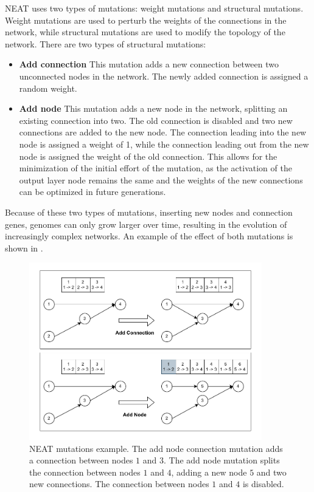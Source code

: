 NEAT uses two types of mutations: weight mutations and structural mutations. Weight mutations are used to perturb the weights of the connections in the network, while
structural mutations are used to modify the topology of the network. There are two types of structural mutations:

\begin{itemize}
    \item \textbf{Add connection} This mutation adds a new connection between two unconnected nodes in the network. The newly added connection is assigned a random weight.
    \item \textbf{Add node} This mutation adds a new node in the network, splitting an existing connection into two. The old connection is disabled and two new
        connections are added to the new node. The connection leading into the new node is assigned a weight of 1, while the connection leading out from the new node is
        assigned the weight of the old connection. This allows for the minimization of the initial effort of the mutation, as the activation of the output layer
        node remains the same and the weights of the new connections can be optimized in future generations.
\end{itemize}

Because of these two types of mutations, inserting new nodes and connection genes, genomes can only grow larger over time, resulting in the evolution of increasingly
complex networks. An example of the effect of both mutations is shown in .

\begin{figure}
    \centering
    \includegraphics[width=0.9\textwidth]{Pictures/neat_mutations}
    \caption{NEAT mutations example. The add node connection mutation adds a connection between nodes $1$ and $3$.
    The add node mutation splits the connection between nodes $1$ and $4$, adding a new node $5$ and two new connections. The connection between nodes $1$ and $4$ is disabled.}
    \label{fig:neat_mutations}
\end{figure}

